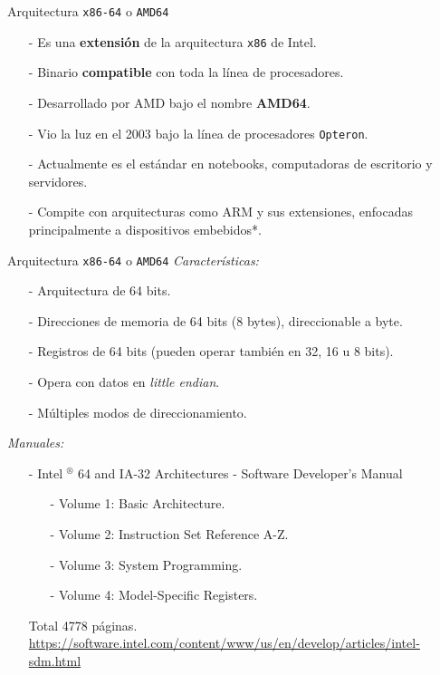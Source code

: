 \documentclass[aspectratio=169]{beamer}
\begin{document}
\begin{frame}[fragile]{Arquitectura \texttt{x86-64} o \texttt{AMD64}}
    \begin{itemize}
    \setlength\itemsep{0.5cm}
    \item[-] Es una \textbf{extensión} de la arquitectura \texttt{x86} de Intel.
    \item[-] Binario \textbf{compatible} con toda la línea de procesadores.
    \item[-] Desarrollado por AMD bajo el nombre \textbf{AMD64}.
    \item[-] Vio la luz en el 2003 bajo la línea de procesadores \texttt{Opteron}.
    \item[-] Actualmente es el estándar en notebooks, computadoras de escritorio y servidores.
    \item[-] Compite con arquitecturas como ARM y sus extensiones, enfocadas principalmente a dispositivos embebidos*.
    \end{itemize}
\end{frame}

\begin{frame}[fragile]{Arquitectura \texttt{x86-64} o \texttt{AMD64}}
    \textit{Características:}\\
    \begin{itemize}
    \item[-] Arquitectura de 64 bits.
    \item[-] Direcciones de memoria de 64 bits (8 bytes), direccionable a byte.
    \item[-] Registros de 64 bits (pueden operar también en 32, 16 u 8 bits).
    \item[-] Opera con datos en \textit{little endian}.
    \item[-] Múltiples modos de direccionamiento.
    \end{itemize}
    \pause
    \textit{Manuales:}\\
    \begin{itemize}
    \item[-] Intel $^{\circledR}$ 64 and IA-32 Architectures - Software Developer’s Manual\\
    \begin{itemize}
    \item[-] Volume 1: Basic Architecture.
    \item[-] Volume 2: Instruction Set Reference A-Z.
    \item[-] Volume 3: System Programming.
    \item[-] Volume 4: Model-Specific Registers.
    \end{itemize}
    Total 4778 páginas.\\
    { \scriptsize \url{https://software.intel.com/content/www/us/en/develop/articles/intel-sdm.html} }\\
    \end{itemize}
\end{frame}
\end{document}
